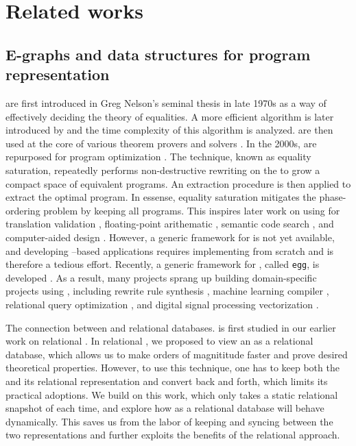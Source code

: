 \chapter{Related works}

\section{E-graphs and data structures for program representation}

\Egraphs are first introduced in Greg Nelson's seminal thesis \citep{nelson-thesis}
 in late 1970s 
 as a way of effectively deciding the theory of equalities.
A more efficient algorithm is later introduced by \citet{tarjan-congruence} 
 and the time complexity of this algorithm is analyzed.
\Egraphs are then used at the core of 
 various theorem provers and solvers \citep{simplify, z3, cvc4}.
In the 2000s, 
 \egraphs are repurposed for program optimization \citet{eqsat,denali}.
The technique, known as equality saturation, 
 repeatedly performs non-destructive rewriting on the \egraphs 
 to grow a compact space of equivalent programs.
An extraction procedure is then applied to extract the optimal program.
In essense, equality saturation mitigates the phase-ordering problem by keeping 
 all programs.
This inspires later work on using \egraphs for
 translation validation \citep{eqsat-tv}, 
 floating-point arithematic \citep{herbie},
 semantic code search \citep{semsearch},
 and computer-aided design \citep{carpentry-compiler}.
However, a generic framework for \egraphs is not yet available,
 and developing \egraphs--based applications
 requires implementing \egraphs from scratch and is therefore a tedious effort.
Recently, a generic framework for \egraphs, 
 called \texttt{egg}, is developed \citep{egg}.
As a result, many projects sprang up building domain-specific projects using \egraphs,
 including rewrite rule synthesis \citep{ruler}, machine learning compiler \citep{tensat,glenside},
 relational query optimization \citep{spores}, and
 digital signal processing vectorization \citep{diospyros}.

The connection between \egraphs and relational databases.
 is first studied in our earlier work on relational \ematching\citep{relational-ematching}.
In relational \ematching, 
 we proposed to view an \egraph as a relational database,
 which allows us to make \ematching orders of magnititude faster
 and prove desired theoretical properties.
However, to use this technique,
 one has to keep both the \egraph and its relational representation 
 and convert back and forth, which limits its practical adoptions.
We build on this work, 
 which only takes a static relational snapshot of \egraph each time,
 and explore how \egraphs as a relational database will behave dynamically.
This saves us from the labor of keeping and syncing between the two \egraph representations
 and further exploits the benefits of the relational \ematching approach.


